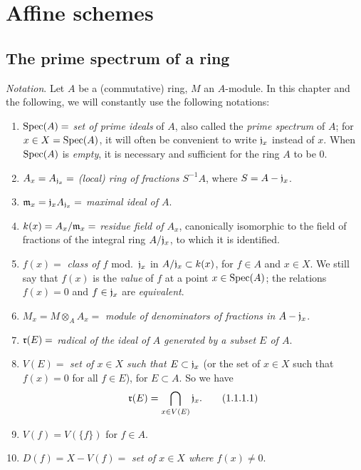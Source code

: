 \setcounter{section}{0}
\section{Affine schemes}
\label{section-affine-schemes}

\setcounter{subsection}{0}
\subsection{The prime spectrum of a ring}
\label{subsection-prime-spec}

\begin{env}[1.1.1]
\label{1.1.1.1}
\emph{Notation}. Let $A$ be a (commutative) ring, $M$ an $A$-module. In
this chapter and the following, we will constantly use the following notations:
\begin{enumerate}[label=--]
  \item ${\mathop{\mathrm{Spec}}\nolimits}(A)=$ \emph{set of prime ideals} of $A$, also called the \emph{prime spectrum} of $A$; for $x\in X={\mathop{\mathrm{Spec}}\nolimits}(A)$, it will often be convenient to write $\mathfrak{j}_x$ instead of $x$.
    When ${\mathop{\mathrm{Spec}}\nolimits}(A)$ is \emph{empty}, it is necessary and sufficient for the ring $A$ to be $0$.
  \item $A_x=A_{\mathfrak{j}_x}=$ \emph{(local) ring of fractions $S^{-1}A$}, where $S=A-\mathfrak{j}_x$.
  \item $\mathfrak{m}_x=\mathfrak{j}_x A_{\mathfrak{j}_x}=$ \emph{maximal ideal of $A$}.
  \item $k(x)=A_x/\mathfrak{m}_x=$ \emph{residue field of $A_x$}, canonically isomorphic to the field of fractions of the integral ring $A/\mathfrak{j}_x$, to which it is identified.
  \item $f(x)=$ \emph{class of $f$} mod.~$\mathfrak{j}_x$ in $A/\mathfrak{j}_x\subset k(x)$, for $f\in A$ and $x\in X$.
    We still say that $f(x)$ is the \emph{value} of $f$ at a point $x\in{\mathop{\mathrm{Spec}}\nolimits}(A)$; the relations $f(x)=0$ and $f\in\mathfrak{j}_x$ are \emph{equivalent}.
  \item $M_x=M\otimes_A A_x=$ \emph{module of denominators of fractions in $A-\mathfrak{j}_x$}.
  \item $\mathfrak{r}(E)=$ \emph{radical of the ideal of $A$ generated by a subset $E$ of $A$}.
  \item $V(E)=$ \emph{set of $x\in X$ such that $E\subset\mathfrak{j}_x$} (or the set of $x\in X$ such that $f(x)=0$ for all $f\in E$), for $E\subset A$.
    So we have
    \[
      \mathfrak{r}(E)=\bigcap_{x\in V(E)}\mathfrak{j}_x.
      \tag{1.1.1.1}
    \]
  \item $V(f)=V(\{f\})$ for $f\in A$.
  \item $D(f)=X-V(f)=$ \emph{set of $x\in X$ where $f(x)\neq 0$}.
\end{enumerate}
\end{env}

